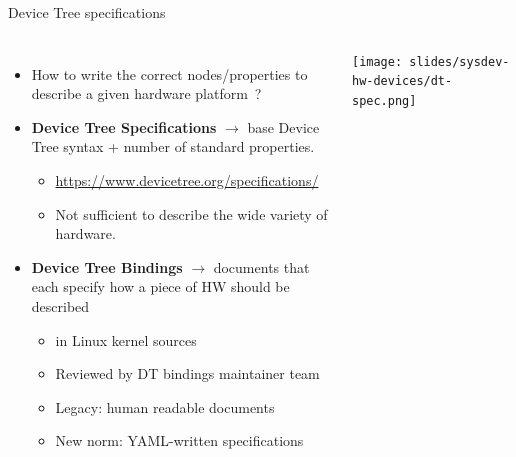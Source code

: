\begin{frame}{Device Tree specifications}
  \begin{columns}
    \begin{itemize}
    \item How to write the correct nodes/properties to describe a
      given hardware platform~?
    \item {\bf Device Tree Specifications} $\rightarrow$ base Device
      Tree syntax + number of standard properties.
      \begin{itemize}
      \item \url{https://www.devicetree.org/specifications/}
      \item Not sufficient to describe the wide variety of hardware.
      \end{itemize}
    \item {\bf Device Tree Bindings} $\rightarrow$ documents that each
      specify how a piece of HW should be described
      \begin{itemize}
      \item {} in Linux kernel sources
      \item Reviewed by DT bindings maintainer team
      \item Legacy: human readable documents
      \item New norm: YAML-written specifications
      \end{itemize}
    \end{itemize}
    \texttt{[image: slides/sysdev-hw-devices/dt-spec.png]}
  \end{columns}
\end{frame}

